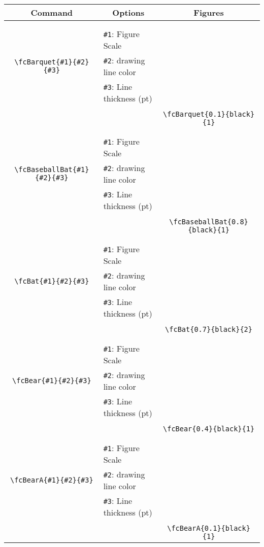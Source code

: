 \documentclass[x11names]{article}
\begin{document}
\begin{table}[H]\centering\begin{tabular}{|c|l|c|}\hline {\bf Command}& \multicolumn{1}{c|}{{\bf Options}} & {\bf Figures}\\  \hline	&&\multirow{5}{*}{\fcBarquet{0.1}{black}{1}}\\	&&\\	&\verb|#1|: Figure Scale &\\	\verb|\fcBarquet{#1}{#2}{#3}|&	\verb|#2|: drawing line color &\\	&\verb|#3|: Line thickness (pt) &\\ &&\\&&	\verb|\fcBarquet{0.1}{black}{1}|\\\hline 	
	&&\multirow{5}{*}{\fcBaseballBat{0.8}{black}{1}}\\	&&\\	&\verb|#1|: Figure Scale &\\	\verb|\fcBaseballBat{#1}{#2}{#3}|&	\verb|#2|: drawing line color &\\	&\verb|#3|: Line thickness (pt) &\\ &&\\&&	\verb|\fcBaseballBat{0.8}{black}{1}|\\\hline 	
	&&\multirow{5}{*}{\fcBat{0.7}{black}{2}}\\	&&\\	&\verb|#1|: Figure Scale &\\	\verb|\fcBat{#1}{#2}{#3}|&	\verb|#2|: drawing line color &\\	&\verb|#3|: Line thickness (pt) &\\ &&\\&&	\verb|\fcBat{0.7}{black}{2}|\\\hline 	
	&&\multirow{5}{*}{\fcBear{0.4}{black}{1}}\\	&&\\	&\verb|#1|: Figure Scale &\\	\verb|\fcBear{#1}{#2}{#3}|&	\verb|#2|: drawing line color &\\	&\verb|#3|: Line thickness (pt) &\\ &&\\&&	\verb|\fcBear{0.4}{black}{1}|\\\hline 	
	&&\multirow{5}{*}{\fcBearA{0.1}{black}{1}}\\	&&\\	&\verb|#1|: Figure Scale &\\	\verb|\fcBearA{#1}{#2}{#3}|&	\verb|#2|: drawing line color &\\	&\verb|#3|: Line thickness (pt) &\\ &&\\&&	\verb|\fcBearA{0.1}{black}{1}|\\\hline 	

\end{tabular}
\end{table}
\end{document}
